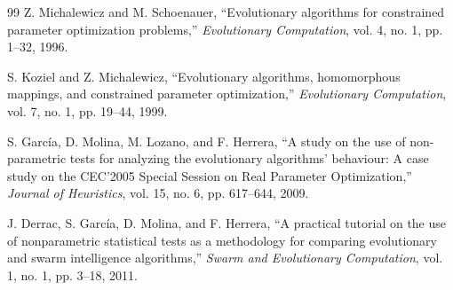 \documentclass[a4paper,fleqn]{cas-sc}
\begin{document}
\begin{thebibliography}{99}
Z. Michalewicz and M. Schoenauer, ``Evolutionary algorithms for constrained parameter optimization problems,'' \emph{Evolutionary Computation}, vol. 4, no. 1, pp. 1--32, 1996.

S. Koziel and Z. Michalewicz, ``Evolutionary algorithms, homomorphous mappings, and constrained parameter optimization,'' \emph{Evolutionary Computation}, vol. 7, no. 1, pp. 19--44, 1999.

S. Garc\'{i}a, D. Molina, M. Lozano, and F. Herrera, ``A study on the use of non-parametric tests for analyzing the evolutionary algorithms' behaviour: A case study on the CEC'2005 Special Session on Real Parameter Optimization,'' \emph{Journal of Heuristics}, vol. 15, no. 6, pp. 617--644, 2009.

J. Derrac, S. Garc\'{i}a, D. Molina, and F. Herrera, ``A practical tutorial on the use of nonparametric statistical tests as a methodology for comparing evolutionary and swarm intelligence algorithms,'' \emph{Swarm and Evolutionary Computation}, vol. 1, no. 1, pp. 3--18, 2011.

\end{thebibliography}
\end{document}
